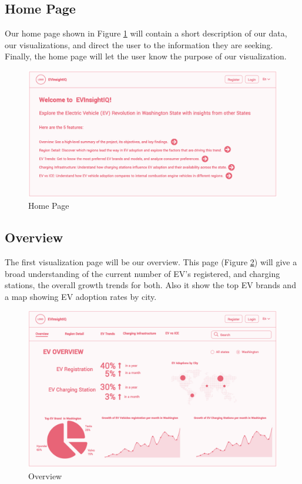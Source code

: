 \documentclass{article}
\begin{document}
\subsection{Home Page}
Our home page shown in Figure \ref{fig:home} will contain a short
description of our data, our visualizations, and direct the user to the
information they are seeking.  Finally, the home page will let the user know the
purpose of our visualization.
\begin{figure}[ht]
    \centering
    \includegraphics[scale=0.35]{Home}
    \caption{Home Page}
    \label{fig:home}
\end{figure}

\newpage
\subsection{Overview}
The first visualization page will be our overview.  This page (Figure
\ref{fig:overview}) will give a broad understanding of the current number of
EV's registered, and charging stations, the overall growth trends for both. Also
it show the top EV brands and a map showing EV adoption rates by city.
\begin{figure}[ht]
    \centering
    \includegraphics[scale=0.25]{Overview}
    \caption{Overview}
    \label{fig:overview}
\end{figure}
\end{document}
